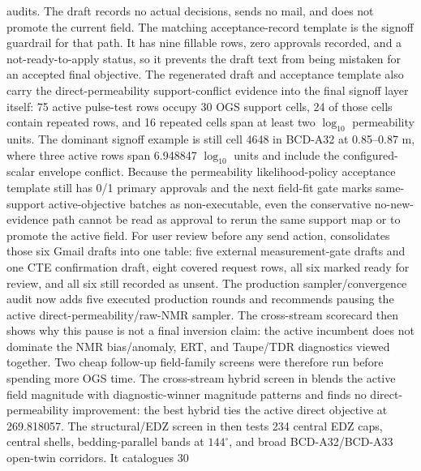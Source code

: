 audits.  The draft records no actual decisions, sends no mail, and does not promote
the current field.
The matching acceptance-record template
is the signoff guardrail for that path.  It has nine fillable rows, zero approvals
recorded, and a not-ready-to-apply status, so it prevents the draft text from being
mistaken for an accepted final objective.
The regenerated draft and acceptance template also carry the direct-permeability
support-conflict evidence into the final signoff layer itself: 75 active pulse-test
rows occupy 30 OGS support cells, 24 of those cells contain repeated rows, and 16
repeated cells span at least two \(\log_{10}\) permeability units.  The dominant
signoff example is still cell 4648 in BCD-A32 at 0.85--0.87 m, where three active
rows span 6.948847 \(\log_{10}\) units and include the configured-scalar envelope
conflict.  Because the permeability likelihood-policy acceptance template still has
0/1 primary approvals and the next field-fit gate marks same-support
active-objective batches as non-executable, even the conservative
no-new-evidence path cannot be read as approval to rerun the same support map or to
promote the active field.
For user review before any send action,
 consolidates those six
Gmail drafts into one table: five external measurement-gate drafts and one CTE
confirmation draft, eight covered request rows, all six marked ready for review, and
all six still recorded as unsent.
The production sampler/convergence audit now adds five executed production rounds
and recommends pausing the active direct-permeability/raw-NMR sampler.  The
cross-stream scorecard then shows why this pause is not a final inversion claim:
the active incumbent does not dominate the NMR bias/anomaly, ERT, and Taupe/TDR
diagnostics viewed together.
Two cheap follow-up field-family screens were therefore run before spending more
OGS time.  The cross-stream hybrid screen in
blends the active field magnitude with diagnostic-winner magnitude patterns and
finds no direct-permeability improvement: the best hybrid ties the active direct
objective at 269.818057.  The structural/EDZ screen in
then tests 234 central EDZ caps, central shells, bedding-parallel bands at
\(144^\circ\), and broad BCD-A32/BCD-A33 open-twin corridors.  It catalogues 30
